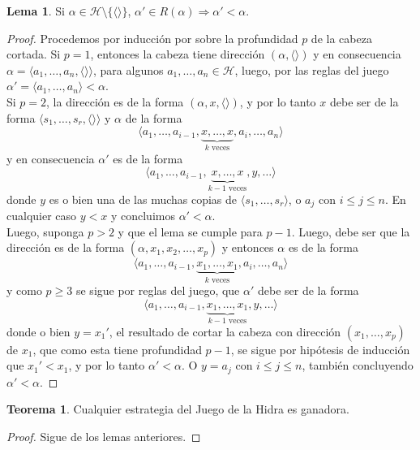 \documentclass[a4paper,11pt]{article}
\newcommand{\mH}{\mathcal{H}}
\newcommand{\lag}{\langle}
\newcommand{\rag}{\rangle}
\theoremstyle{definition}
\newtheorem{lemma}{Lema}
\newtheorem{theorem}{Teorema}
\begin{document}
\begin{lemma}
  Si $\alpha \in \mH \setminus \{\lag\rag\}$, $\alpha' \in R(\alpha) \Rightarrow \alpha' < \alpha$.
\end{lemma}
\begin{proof}
  Procedemos por inducción por sobre la profundidad $p$ de la cabeza cortada. Si
  $p=1$, entonces la cabeza tiene dirección $(\alpha,\lag\rag)$ y en consecuencia
  $\alpha = \lag a_1,\dots,a_n,\lag\rag\rag$, para algunos $a_1,\dots,a_n \in \mH$,
  luego, por las reglas del juego $\alpha' = \lag a_1,\dots,a_n \rag < \alpha$.\\ Si
  $p=2$, la dirección es de la forma $(\alpha,x,\lag\rag)$, y por lo tanto $x$
  debe ser de la forma $\lag s_1,\dots,s_r,\lag\rag\rag$ y $\alpha$  de la forma
  $$
  \lag a_1,\dots,a_{i-1},\underbrace{x,\dots,x}_{k \text{ veces}},a_{i},\dots,a_n\rag
  $$
  y en consecuencia $\alpha'$ es de la forma
  $$
  \lag a_1,\dots,a_{i-1},\underbrace{x,\dots,x}_{k-1 \text{ veces}},y,\dots\rag
  $$
  donde $y$ es o bien una de las muchas
  copias de $\lag s_1,\dots,s_r\rag$, o $a_{j}$ con $i \leq j \leq n$. En cualquier
  caso $y < x$ y concluimos $\alpha' < \alpha$.\\
  Luego, suponga $p > 2$ y que el lema se cumple para $p-1$. Luego, debe
  ser que la dirección es de la forma $(\alpha,x_1,x_2,\dots,x_p)$ y entonces
  $\alpha$ es de la forma
  $$
  \lag a_1,\dots,a_{i-1},\underbrace{x_1,\dots,x_1}_{k \text{ veces}},a_{i},\dots,a_n\rag
  $$
   y como $p\geq 3$ se sigue por reglas del juego, que $\alpha'$ debe ser de la forma
  $$
  \lag a_1,\dots,a_{i-1},\underbrace{x_1,\dots,x_1}_{k-1 \text{ veces}},y,\dots\rag
  $$
  donde o bien $y = x_1'$, el resultado de cortar la cabeza con dirección $(x_1,\dots,x_p)$ de $x_1$,
  que como esta tiene profundidad $p-1$, se sigue por hipótesis de inducción
  que $x_1' < x_1$, y por lo tanto $\alpha' < \alpha$. O $ y = a_{j}$ con
  $i \leq j \leq n$, también concluyendo $\alpha' < \alpha$.
\end{proof}

\begin{theorem}
  Cualquier estrategia del Juego de la Hidra es ganadora.
\end{theorem}
\begin{proof}
  Sigue de los lemas anteriores.
\end{proof}




\end{document}
